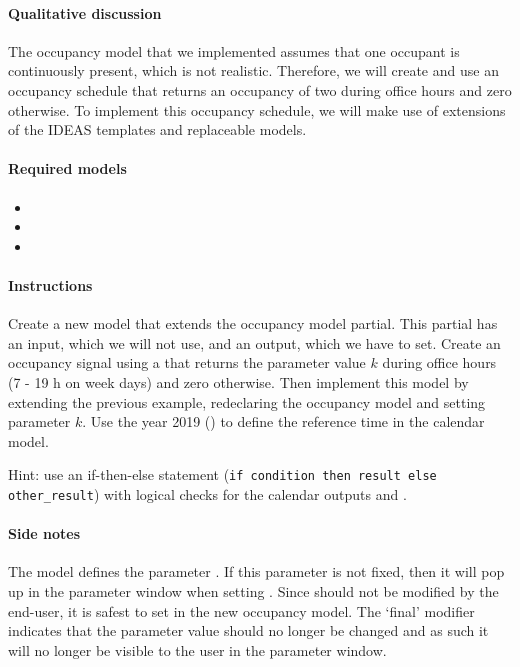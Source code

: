 \documentclass[10pt,a4paper]{article}
\begin{document}
\paragraph{Qualitative discussion}
The occupancy model that we implemented assumes
that one occupant is continuously present,
which is not realistic. Therefore, we will create and use an occupancy schedule that returns an occupancy of two during
office hours and zero otherwise. To implement this occupancy schedule, we will make use of extensions of the IDEAS templates and replaceable models.

\paragraph{Required models}
\begin{itemize}
\item {}
\item {}
\item {}
\end{itemize}

\paragraph{Instructions}
Create a new model that extends the occupancy model partial.
This partial has an input, which we will not use, and an output, which we have to set.
Create an occupancy signal using a  that
returns the parameter value $k$ during office hours 
(7 - 19 h on week days) and zero otherwise.
Then implement this model by extending the previous example, 
redeclaring the occupancy model and setting parameter $k$.
Use the year 2019 () to define the reference time in the calendar model.

Hint: use an if-then-else statement (\texttt{if condition then result else other\_result}) with logical checks for the calendar outputs  and .

\paragraph{Side notes}
The model  
defines the parameter .
If this parameter is not fixed, then it will pop up in the parameter window when
setting . Since  should not be modified by the end-user,
it is safest to set  in the new occupancy model.
The `final' modifier indicates that the parameter value should no longer be changed
and as such it will no longer be visible to the user in the parameter window.
\end{document}
